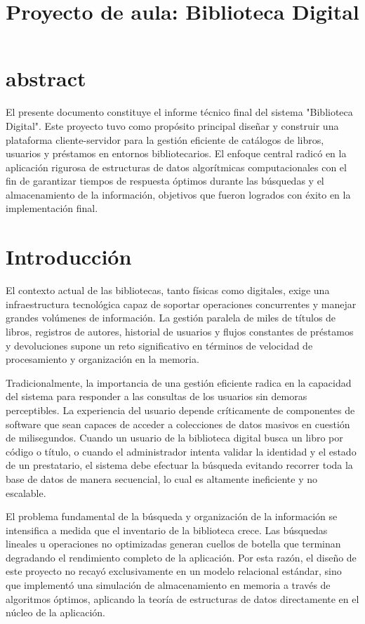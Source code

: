 \documentclass{rapport}
\title{Proyecto de aula: Biblioteca Digital}
\begin{document}
\subject{Proyecto - Estructura de datos}

\buildmargins 
\buildcover 
\toc \section{abstract}
El presente documento constituye el informe técnico final del sistema "Biblioteca Digital". Este proyecto tuvo como propósito principal diseñar y construir una plataforma cliente-servidor para la gestión eficiente de catálogos de libros, usuarios y préstamos en entornos bibliotecarios. El enfoque central radicó en la aplicación rigurosa de estructuras de datos algorítmicas computacionales con el fin de garantizar tiempos de respuesta óptimos durante las búsquedas y el almacenamiento de la información, objetivos que fueron logrados con éxito en la implementación final.

\section{Introducción}

El contexto actual de las bibliotecas, tanto físicas como digitales, exige una infraestructura tecnológica capaz de soportar operaciones concurrentes y manejar grandes volúmenes de información. La gestión paralela de miles de títulos de libros, registros de autores, historial de usuarios y flujos constantes de préstamos y devoluciones supone un reto significativo en términos de velocidad de procesamiento y organización en la memoria.

Tradicionalmente, la importancia de una gestión eficiente radica en la capacidad del sistema para responder a las consultas de los usuarios sin demoras perceptibles. La experiencia del usuario depende críticamente de componentes de software que sean capaces de acceder a colecciones de datos masivos en cuestión de milisegundos. Cuando un usuario de la biblioteca digital busca un libro por código o título, o cuando el administrador intenta validar la identidad y el estado de un prestatario, el sistema debe efectuar la búsqueda evitando recorrer toda la base de datos de manera secuencial, lo cual es altamente ineficiente y no escalable.

El problema fundamental de la búsqueda y organización de la información se intensifica a medida que el inventario de la biblioteca crece. Las búsquedas lineales u operaciones no optimizadas generan cuellos de botella que terminan degradando el rendimiento completo de la aplicación. Por esta razón, el diseño de este proyecto no recayó exclusivamente en un modelo relacional estándar, sino que implementó una simulación de almacenamiento en memoria a través de algoritmos óptimos, aplicando la teoría de estructuras de datos directamente en el núcleo de la aplicación.
\end{document}
